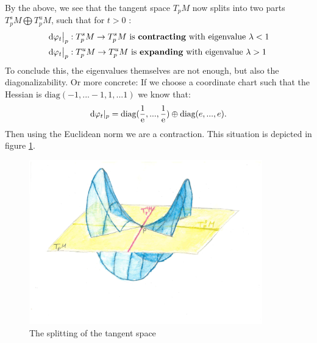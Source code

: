 \begin{cor}\label{cor: Tangendspace splits}
	By the above, we see that the tangent space $T_pM$ now splits into two parts $T_p^sM\bigoplus T_p^uM$, such that for $t>0$ :
	\begin{align*}
		&\mathop{}\!\mathrm{d} \varphi_t\big|_p:T_p^sM\to T_p^sM \text{ is \textbf{contracting} with eigenvalue $\lambda<1$}\\
		&\mathop{}\!\mathrm{d} \varphi_t\big|_p:T_p^uM\to T_p^uM \text{ is \textbf{expanding} with eigenvalue $\lambda>1$}\\
	\end{align*}
	To conclude this, the eigenvalues themselves are not enough, but also the diagonalizability. Or more concrete: If we choose a coordinate chart such that the Hessian is $\text{diag}(-1,...-1,1,...1)$ we know that: 
	\begin{align*}
		\mathop{}\!\mathrm{d} \varphi _t |_p= \text{diag}(\frac{1}{\mathrm{e}},...,\frac{1}{\mathrm{e}})\oplus \text{diag}(e,...,e).
	\end{align*} Then using the Euclidean norm we are a contraction. This situation is depicted in figure \ref{fig: The splitting of the tangent space}.
\end{cor}


\begin{figure}
	\centering
	\includegraphics[width=0.9\textwidth]{Text/Pictures/Unstable Manifold/split tangend space.pdf}
	\caption{The splitting of the tangent space}
	\label{fig: The splitting of the tangent space}
\end{figure}

